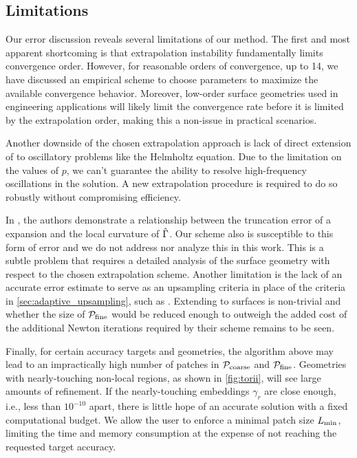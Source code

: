 \subsection{Limitations \label{sec:limitations}}
Our error discussion reveals several limitations of our method. 
The first and most apparent shortcoming is that extrapolation instability fundamentally limits convergence order. 
However, for reasonable orders of convergence, up to 14, we have discussed an empirical scheme to choose parameters to maximize the available convergence behavior.
Moreover, low-order surface geometries used in engineering applications will likely limit the convergence rate before it is limited by the extrapolation order, making this a non-issue in practical scenarios.

Another downside of the chosen extrapolation approach is lack of direct extension of \qbkix to oscillatory problems like the Helmholtz equation.
Due to the limitation on the values of $p$, we can't guarantee the ability to resolve high-frequency oscillations in the solution.
A new extrapolation procedure is required to do so robustly without compromising efficiency.

In \cite{wala20193d}, the authors demonstrate a relationship between the truncation error of a \qbx expansion and the local curvature of $\hat{\Gamma}$. 
Our scheme also is susceptible to this form of error and we do not address nor analyze this in this work.
This is a subtle problem that requires a detailed analysis of the surface geometry with respect to the chosen extrapolation scheme.
Another  limitation is the lack of an accurate error estimate to serve as an upsampling criteria in place of the criteria in \cref{sec:adaptive_upsampling}, such as \cite{klinteberg2019accurate}. 
Extending \cite{klinteberg2019accurate} to \threed surfaces is non-trivial and whether the size of ${\mathcal{P}_{\mathrm{fine}}}$ would be reduced enough to outweigh the added cost of the additional Newton iterations required by their scheme remains to be seen.

Finally, for certain accuracy targets and geometries, the algorithm above may lead to an impractically high number of patches in ${\mathcal{P}_{\mathrm{coarse}}}$ and ${\mathcal{P}_{\mathrm{fine}}}$. 
Geometries with nearly-touching non-local regions, as shown in \cref{fig:torii}, will see large amounts of refinement.
If the nearly-touching embeddings $\gamma_r$ are close enough, i.e., less than $10^{-10}$ apart, there is little hope of an accurate solution with a fixed computational budget.
We allow the user to enforce a minimal patch size $L_{\mathrm{min}}$, limiting the time and memory consumption at the expense of not reaching the requested target accuracy. 
